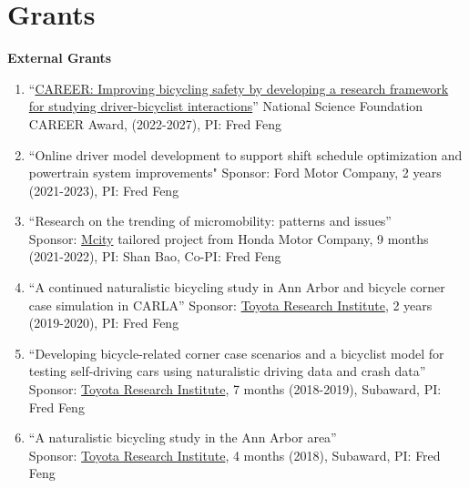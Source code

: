 \documentclass[11pt]{article}
\newenvironment{main}
{\begin{adjustwidth}{3em}{}}
{\end{adjustwidth}}
\begin{document}
\section*{Grants}
\begin{main}


\textbf{External Grants}

\begin{enumerate}
    \item ``\href{https://www.nsf.gov/awardsearch/showAward?AWD_ID=2142757}{CAREER: Improving bicycling safety by developing a research framework for studying driver-bicyclist interactions}''
        National Science Foundation CAREER Award, (2022-2027), PI: Fred Feng
    \item ``Online driver model development to support shift schedule optimization and powertrain system improvements"
        Sponsor: Ford Motor Company, 2 years (2021-2023), PI: Fred Feng
    \item ``Research on the trending of micromobility: patterns and issues'' \\
        Sponsor: \href{https://mcity.umich.edu/}{Mcity} tailored project from Honda Motor Company, 9 months (2021-2022), PI: Shan Bao, Co-PI: Fred Feng
    \item ``A continued naturalistic bicycling study in Ann Arbor and bicycle corner case simulation in CARLA''
        Sponsor: \href{https://www.tri.global/}{Toyota Research Institute}, 2 years (2019-2020), PI: Fred Feng
    \item ``Developing bicycle-related corner case scenarios and a bicyclist model for testing self-driving cars using naturalistic driving data and crash data'' \\
        Sponsor: \href{https://www.tri.global/}{Toyota Research Institute}, 7 months (2018-2019), Subaward, PI: Fred Feng
    \item ``A naturalistic bicycling study in the Ann Arbor area'' \\
        Sponsor: \href{https://www.tri.global/}{Toyota Research Institute}, 4 months (2018), Subaward, PI: Fred Feng

    \end{enumerate}


\end{main}
\end{document}
